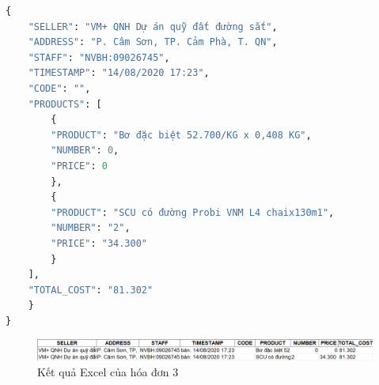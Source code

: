 \begin{lstlisting}[language=Python]
{
    "SELLER": "VM+ QNH Dự án quỹ đất đường sắt",
    "ADDRESS": "P. Câm Sơn, TP. Cảm Phà, T. QN",
    "STAFF": "NVBH:09026745",
    "TIMESTAMP": "14/08/2020 17:23",
    "CODE": "",
    "PRODUCTS": [
        {
        "PRODUCT": "Bơ đặc biệt 52.700/KG x 0,408 KG",
        "NUMBER": 0,
        "PRICE": 0
        },
        {
        "PRODUCT": "SCU có đường Probi VNM L4 chaix130m1",
        "NUMBER": "2",
        "PRICE": "34.300"
        }
    ],
    "TOTAL_COST": "81.302"
    }
}
\end{lstlisting}

\begin{figure}[h]
    \includegraphics[scale=0.314]{images/result-demo-excel-3.png}
    \caption{Kết quả Excel của hóa đơn 3}
\end{figure}

